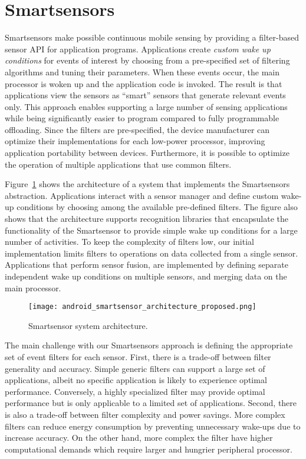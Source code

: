\section{Smartsensors}
\label{sec:approach}

Smartsensors make possible continuous mobile sensing by providing a
filter-based sensor API for application programs.  Applications create
{\em custom wake up conditions} for events of interest by choosing
from a pre-specified set of filtering algorithms and tuning their
parameters.  When these events occur, the main processor is woken up
and the application code is invoked. The result is that applications
view the sensors as ``smart'' sensors that generate relevant events
only.  This approach enables supporting a large number of sensing
applications while being significantly easier to program compared to
fully programmable offloading. Since the filters are pre-specified,
the device manufacturer can optimize their implementations for each
low-power processor, improving application portability between
devices.  Furthermore, it is possible to optimize the operation of
multiple applications that use common filters.

Figure~\ref{fig:smartarchitecture} shows the architecture of a
system that implements the Smartsensors abstraction.  Applications
interact with a sensor manager and define custom wake-up conditions by
choosing among the available pre-defined filters.  The figure also
shows that the architecture supports recognition libraries that
encapsulate the functionality of the Smartsensor to provide simple
wake up conditions for a large number of activities.  To keep the
complexity of filters low, our initial implementation limits filters
to operations on data collected from a single sensor.  Applications
that perform sensor fusion, are implemented by defining separate
independent wake up conditions on multiple sensors, and merging data on
the main processor.


\begin{figure}[t]
	\texttt{[image: android\_smartsensor\_architecture\_proposed.png]}
	\caption{Smartsensor system architecture.}
    \label{fig:smartarchitecture}
\end{figure}

The main challenge with our Smartsensors approach is defining the
appropriate set of event filters for each sensor.  First, there is a
trade-off between filter generality and accuracy.  Simple generic
filters can support a large set of applications, albeit no specific
application is likely to experience optimal performance.  Conversely, a
highly specialized filter may provide optimal performance but is only
applicable to a limited set of applications.  Second, there is also a
trade-off between filter complexity and power savings.  More complex
filters can reduce energy consumption by preventing unnecessary
wake-ups due to increase accuracy.  On the other hand, more complex
the filter have higher computational demands which require larger and
hungrier peripheral processor.

